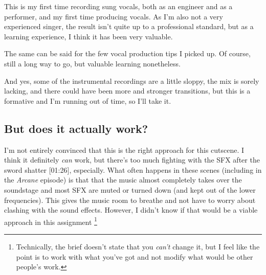 




This is my first time recording sung vocals, both as an engineer and as a performer, and my first time producing vocals. As I'm also not a very experienced singer, the result isn't quite up to a professional standard, but as a learning experience, I think it has been very valuable.

The same can be said for the few vocal production tips I picked up. Of course, still a long way to go, but valuable learning nonetheless.

And yes, some of the instrumental recordings are a little sloppy, the mix is sorely lacking, and there could have been more and stronger transitions, but this is a formative and I'm running out of time, so I'll take it.

\subsection*{But does it actually work?}

I'm not entirely convinced that this is the right approach for this cutscene. I think it definitely \textit{can} work, but there's too much fighting with the SFX after the sword shatter [01:26], especially. What often happens in these scenes (including in the \textit{Arcane} episode) is that that the music almost completely takes over the soundstage and most SFX are muted or turned down (and kept out of the lower frequencies). This gives the music room to breathe and not have to worry about clashing with the sound effects. However, I didn't know if that would be a viable approach in this assignment \footnote{Technically, the brief doesn't state that you \textit{can't} change it, but I feel like the point is to work with what you've got and not modify what would be other people's work.}

